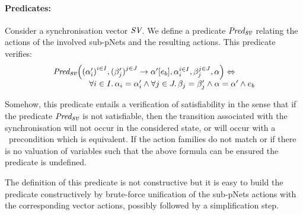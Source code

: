 \documentclass{lncs/llncs}
\begin{document}
\paragraph{Predicates:}
Consider a synchronisation vector $\symb{SV}$. We 
define a
predicate $\Predsv$ relating
the actions of the involved sub-pNets and the resulting actions. This predicate verifies:
\[\begin{array}{l}\Predsv \Big(\SV{{(\alpha'_i)}^{i\in I}, {(\beta'_j)}^{j\in J}} 
{\alpha'} 
{e_b}, \alpha_i^{i\in I}, \beta_j^{j\in J}, \alpha\Big)\Leftrightarrow \\~\qquad\qquad%
%
\forall i\in I.\, \alpha_i=\alpha'_i\land \forall j \in J.\, \beta_j=\beta'_j \land 
\alpha=\alpha' 
\land e_b
\end{array} 
\]

Somehow, this predicate entails a verification of satisfiability in the sense that if the 
predicate $\Predsv$ is not satisfiable, then the transition associated with the 
synchronisation will not occur in the considered state, or will occur with a \False\ precondition which is equivalent.
If the action families do not match or if there is no valuation of
variables such that the above formula can be ensured the predicate is undefined.

The definition of this predicate is not constructive but it is easy to build the predicate constructively by brute-force unification of the sub-pNets actions with the corresponding vector actions, possibly followed by a simplification step.
\end{document}
